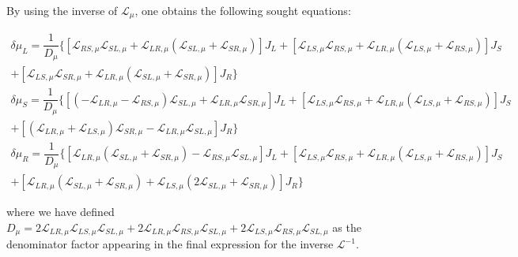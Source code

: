 By using the inverse of $\mathbf{\mathcal{L}}_{\mu}$, one obtains the following sought equations:
\begin{widetext}
\begin{multline}\label{delta:mu:L}
\delta\mu_{L}=\dfrac{1}{D_{\mu}}\{
[\mathcal{L}_{RS,\mu} \mathcal{L}_{SL,\mu}+\mathcal{L}_{LR,\mu} \left(\mathcal{L}_{SL,\mu}+\mathcal{L}_{SR,\mu}\right)]J_{L}+
[\mathcal{L}_{LS,\mu} \mathcal{L}_{RS,\mu}+\mathcal{L}_{LR,\mu}
\left(\mathcal{L}_{LS,\mu}+\mathcal{L}_{RS,\mu}\right)]J_{S}
\\+
[\mathcal{L}_{LS,\mu} \mathcal{L}_{SR,\mu}+\mathcal{L}_{LR,\mu} \left(\mathcal{L}_{SL,\mu}+\mathcal{L}_{SR,\mu}\right)]J_{R}\}
\end{multline}  
\begin{multline}\label{delta:mu:S}
\delta\mu_{S}=\dfrac{1}{D_{\mu}}\{
[\left(-\mathcal{L}_{LR,\mu}-\mathcal{L}_{RS,\mu}\right) \mathcal{L}_{SL,\mu}+\mathcal{L}_{LR,\mu} \mathcal{L}_{SR,\mu}]J_{L}+
[\mathcal{L}_{LS,\mu} \mathcal{L}_{RS,\mu}+\mathcal{L}_{LR,\mu}
\left(\mathcal{L}_{LS,\mu}+\mathcal{L}_{RS,\mu}\right)]J_{S}\\+
[\left(\mathcal{L}_{LR,\mu}+\mathcal{L}_{LS,\mu}\right) \mathcal{L}_{SR,\mu}-\mathcal{L}_{LR,\mu} \mathcal{L}_{SL,\mu}]J_{R}\}
\end{multline} 
\begin{multline}\label{delta:mu:R}
\delta\mu_{R}=\dfrac{1}{D_{\mu}}\{
[\mathcal{L}_{LR,\mu} \left(\mathcal{L}_{SL,\mu}+\mathcal{L}_{SR,\mu}\right)-\mathcal{L}_{RS,\mu} \mathcal{L}_{SL,\mu} ]J_{L}+
[\mathcal{L}_{LS,\mu} \mathcal{L}_{RS,\mu}+\mathcal{L}_{LR,\mu}
\left(\mathcal{L}_{LS,\mu}+\mathcal{L}_{RS,\mu}\right) ]J_{S}\\+
[ \mathcal{L}_{LR,\mu} \left(\mathcal{L}_{SL,\mu}+\mathcal{L}_{SR,\mu}\right)+\mathcal{L}_{LS,\mu} \left(2
\mathcal{L}_{SL,\mu}+\mathcal{L}_{SR,\mu}\right)]J_{R}\}
\end{multline}  
\end{widetext}
where we have defined $D_{\mu}=2 \mathcal{L}_{LR,\mu} \mathcal{L}_{LS,\mu} \mathcal{L}_{SL,\mu}+2 \mathcal{L}_{LR,\mu} \mathcal{L}_{RS,\mu} \mathcal{L}_{SL,\mu}+2 \mathcal{L}_{LS,\mu} \mathcal{L}_{RS,\mu} \mathcal{L}_{SL,\mu}$ as the denominator factor appearing in the final expression for the inverse $\boldsymbol{\mathcal{L}}^{-1}$.


